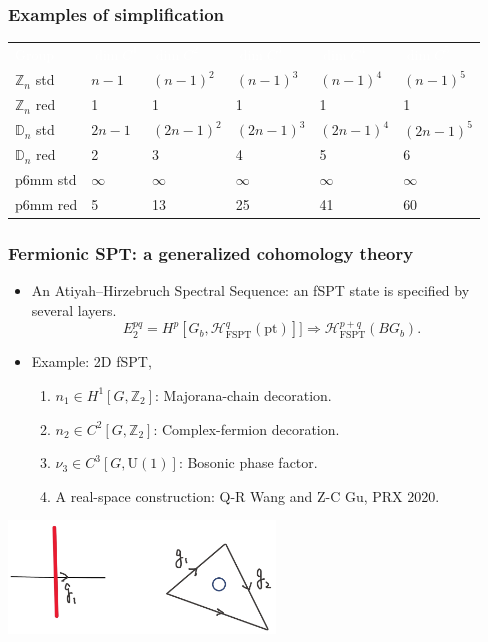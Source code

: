 \documentclass[xcolor=table, 11pt, aspectratio=1610]{beamer}
\renewcommand{\arraystretch}{1.5}
\newcommand{\uone}{\mathrm U(1)}
\begin{document}
\begin{frame}
  \frametitle{Examples of simplification}
 \begin{table}
    \centering
    \begin{tabularx}{\columnwidth}{xxxxxx}
      \textcolor{white}{Group}
      &\textcolor{white}{$\dim C^1$}
      &\textcolor{white}{$\dim C^2$}
      &\textcolor{white}{$\dim C^3$}
      &\textcolor{white}{$\dim C^4$}
      &\textcolor{white}{$\dim C^5$}\\
      $\mathbb Z_n$ std & $n-1$ & $(n-1)^2$ & $(n-1)^3$ & $(n-1)^4$ & $(n-1)^5$\\
      $\mathbb Z_n$ red & 1 & 1 & 1 & 1 & 1\\
      $\mathbb D_n$ std & $2n-1$ & $(2n-1)^2$ & $(2n-1)^3$ & $(2n-1)^4$ & $(2n-1)^5$\\
      $\mathbb D_n$ red & 2 & 3 & 4 & 5 & 6\\
      p6mm std & $\infty$ & $\infty$ & $\infty$ & $\infty$ & $\infty$\\
      p6mm red & 5 & 13 & 25 & 41 & 60\\
    \end{tabularx}
  \end{table}  
\end{frame}

\begin{frame}
	\frametitle{Fermionic SPT: a generalized cohomology theory}
	\begin{itemize}
        \item An Atiyah–Hirzebruch Spectral Sequence: an fSPT state is specified by several layers.
          \[E^{pq}_2=H^p[G_b, \mathcal{H}_{\text{FSPT}}^q(\text{pt})]]\Rightarrow \mathcal{H}_{\text{FSPT}}^{p+q}(BG_b).\]
        \item Example: 2D fSPT,
          \begin{enumerate}
          \item $n_1\in H^1[G, \mathbb Z_2]$: Majorana-chain decoration.
          \item $n_2\in C^2[G, \mathbb Z_2]$: Complex-fermion decoration.
          \item $\nu_3\in C^3[G, \uone]$: Bosonic phase factor.
          \item A real-space construction: Q-R Wang and Z-C Gu, PRX 2020.
          \end{enumerate}
	\end{itemize}

        \begin{center}
          \includegraphics[height=3cm]{fspt_decor}
        \end{center}
\end{frame}
\end{document}
